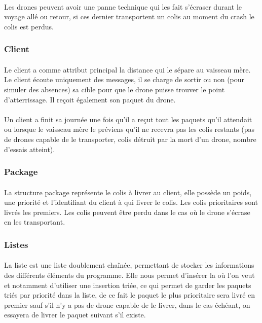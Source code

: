\documentclass[article, backcover, french, nodocumentinfo]{upmethodology-document}
\begin{document}
				\paragraph*{}
					Les drones peuvent avoir une panne technique qui les fait s'écraser durant le voyage allé ou retour, si ces dernier transportent un colis au moment du crash le colis est perdus.
			\subsubsection{Client}
				\paragraph*{}
					Le client a comme attribut principal la distance qui le sépare au vaisseau mère. Le client écoute uniquement des messages,
					il se charge de sortir ou non (pour simuler des absences) sa cible pour que le drone puisse trouver le point d’atterrissage.
					Il reçoit également son paquet du drone.
				\paragraph*{}
					Un client a finit sa journée une fois qu'il a reçut tout les paquets qu'il attendait ou lorsque le vaisseau mère le préviens qu'il ne recevra pas les colis restants (pas de drones capable de le transporter, colis détruit par la mort d'un drone, nombre d'essais atteint).
			\subsubsection{Package}
				\paragraph*{}
					La structure package représente le colis à livrer au client, elle possède un poids, une priorité et l'identifiant du client à qui livrer le colis.
					Les colis prioritaires sont livrés les premiers. Les colis peuvent être perdu dans le cas où le drone s'écrase en les transportant.
			\subsubsection{Listes}
				\paragraph*{}
					La liste est une liste doublement chaînée, permettant de stocker les informations des différents éléments du programme.
					Elle nous permet d'insérer la où l'on veut et notamment d'utiliser une insertion triée, ce qui permet de garder les paquets
					triés par priorité dans la liste, de ce fait le paquet le plus prioritaire sera livré en premier sauf s'il n'y a pas de drone
					capable de le livrer, dans le cas échéant, on essayera de livrer le paquet suivant s'il existe.
\end{document}
